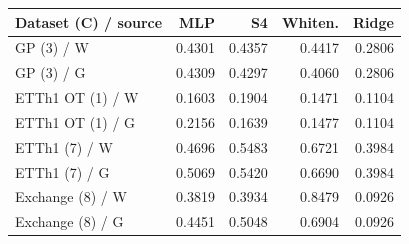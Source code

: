 \begin{tabular}{lrrrr}
\toprule
Dataset (C) / source & MLP & S4 & Whiten. & Ridge \\
\midrule
GP (3) / W & 0.4301 & 0.4357 & 0.4417 & 0.2806 \\
GP (3) / G & 0.4309 & 0.4297 & 0.4060 & 0.2806 \\
ETTh1 OT (1) / W & 0.1603 & 0.1904 & 0.1471 & 0.1104 \\
ETTh1 OT (1) / G & 0.2156 & 0.1639 & 0.1477 & 0.1104 \\
ETTh1 (7) / W & 0.4696 & 0.5483 & 0.6721 & 0.3984 \\
ETTh1 (7) / G & 0.5069 & 0.5420 & 0.6690 & 0.3984 \\
Exchange (8) / W & 0.3819 & 0.3934 & 0.8479 & 0.0926 \\
Exchange (8) / G & 0.4451 & 0.5048 & 0.6904 & 0.0926 \\
\bottomrule
\end{tabular}

